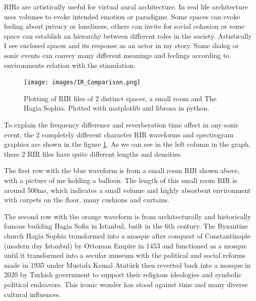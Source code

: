            RIRs are artistically useful for virtual aural architecture. In real life architecture uses volumes to evoke intended emotion or paradigms. Some spaces can evoke feeling about privacy or loneliness, others can invite for social cohesion or some space can establish an hierarchy between different roles in the society\cite{Spaces_Speak_Are_You_Listening?}. Artistically I see enclosed spaces and its response as an actor in my story. Same dialog or sonic events can convey many different meanings and feelings according to environments relation with the stimulation.\par

            \begin{figure}[H]
                \centering
                \texttt{[image: images/IR\_Comparison.png]}
                \caption{Plotting of RIR files of 2 distinct spaces, a small room and The Hagia Sophia. Plotted with matplotlib and librosa in python.}
                \label{fig:IR_COMP}
            \end{figure}

            To explain the frequency difference and reverberation time affect in any sonic event, the 2 completely different character RIR waveforms and spectrogram graphics are shown in the figure \ref{fig:IR_COMP}. As we can see in the left column in the graph, these 2 RIR files have quite different lengths and densities.\par

            The first row with the blue waveform is from a small room RIR shown above, with a picture of me holding a balloon. The length of this small room RIR is around 500ms, which indicates a small volume and highly absorbent environment with carpets on the floor, many cushions and curtains.\par 
            
            The second row with the orange waveform is from architecturally and historically famous building Hagia Sofia in Istanbul, built in the 6th century. The Byzantine church Hagia Sophia transformed into a mosque after conquest of Constantinople (modern day Istanbul) by Ottoman Empire in 1453 and functioned as a mosque until it transformed into a secular museum with the political and social reforms made in 1935 under Mustafa Kemal Atatürk then reverted back into a mosque in 2020 by Turkish government to support their religious ideologies and symbolic political endeavors\cite{Evolution_of_Hagia_Sophia}. This iconic wonder has stood against time and many diverse cultural influences.\par

